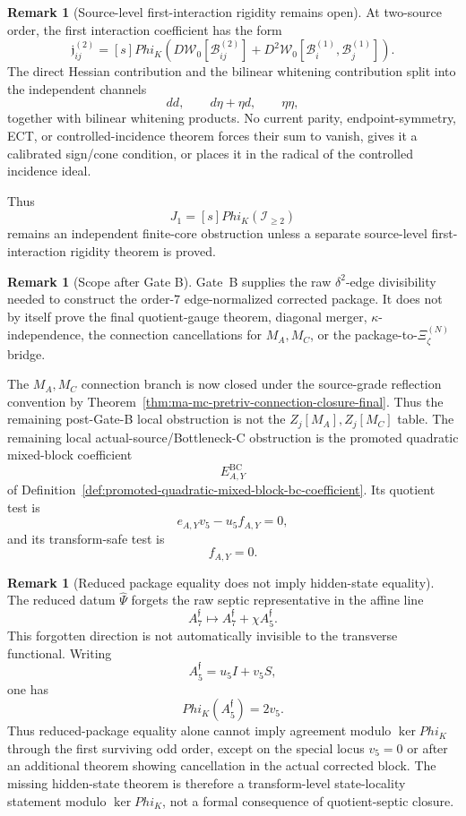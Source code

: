 \documentclass[11pt,a4paper]{amsart}
\def\Phi{Phi}%
\theoremstyle{plain}
\theoremstyle{definition}
\newtheorem{remark}[theorem]{Remark}
\begin{document}
\begin{remark}[Source-level first-interaction rigidity remains open]
\label{rem:source-level-first-interaction-rigidity-open}
At two-source order, the first interaction coefficient has the form
\[
\mathfrak j_{ij}^{(2)}
=
[s]\Phi_K
\left(
D\mathcal W_0[\mathcal B_{ij}^{(2)}]
+
D^2\mathcal W_0[\mathcal B_i^{(1)},\mathcal B_j^{(1)}]
\right).
\]
The direct Hessian contribution and the bilinear whitening contribution split
into the independent channels
\[
dd,\qquad d\eta+\eta d,\qquad \eta\eta,
\]
together with bilinear whitening products.  No current parity,
endpoint-symmetry, ECT, or controlled-incidence theorem forces their sum to
vanish, gives it a calibrated sign/cone condition, or places it in the radical
of the controlled incidence ideal.

Thus
\[
J_1=[s]\Phi_K(\mathcal I_{\ge2})
\]
remains an independent finite-core obstruction unless a separate
source-level first-interaction rigidity theorem is proved.
\end{remark}

\begin{remark}[Scope after Gate B]
\label{rem:scope-after-gate-b}
Gate~B supplies the raw \(\delta^2\)-edge divisibility needed to construct
the order-\(7\) edge-normalized corrected package.  It does not by itself
prove the final quotient-gauge theorem, diagonal merger,
\(\kappa\)-independence, the connection cancellations for \(M_A,M_C\), or
the package-to-\(\Xi_\zeta^{(N)}\) bridge.

The \(M_A,M_C\) connection branch is now closed under the source-grade
reflection convention by
Theorem~\ref{thm:ma-mc-pretriv-connection-closure-final}.  Thus the remaining
post-Gate-B local obstruction is not the \(Z_j[M_A],Z_j[M_C]\) table.  The
remaining local actual-source/Bottleneck-C obstruction is the promoted
quadratic mixed-block coefficient
\[
E_{A,Y}^{\mathrm{BC}}
\]
of Definition~\ref{def:promoted-quadratic-mixed-block-bc-coefficient}.  Its
quotient test is
\[
e_{A,Y}v_5-u_5f_{A,Y}=0,
\]
and its transform-safe test is
\[
f_{A,Y}=0.
\]
\end{remark}

\begin{remark}[Reduced package equality does not imply hidden-state equality]
\label{rem:reduced-package-equality-not-hidden-state-equality}
The reduced datum \(\widehat\Psi\) forgets the raw septic representative in
the affine line
\[
A_7^{\mathfrak f}\longmapsto A_7^{\mathfrak f}+\chi A_5^{\mathfrak f}.
\]
This forgotten direction is not automatically invisible to the transverse
functional.  Writing
\[
A_5^{\mathfrak f}=u_5 I+v_5 S,
\]
one has
\[
\Phi_K(A_5^{\mathfrak f})=2v_5.
\]
Thus reduced-package equality alone cannot imply agreement modulo
\(\ker\Phi_K\) through the first surviving odd order, except on the special
locus \(v_5=0\) or after an additional theorem showing cancellation in the
actual corrected block.  The missing hidden-state theorem is therefore a
transform-level state-locality statement modulo \(\ker\Phi_K\), not a
formal consequence of quotient-septic closure.
\end{remark}
\end{document}
